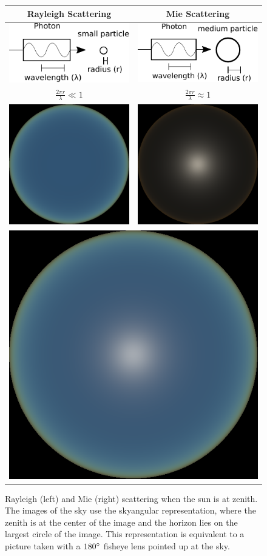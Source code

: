 \begin{figure}
\centering
\newcommand\Tstrut{\rule{0pt}{1\normalbaselineskip}}         %
\newcommand\Bstrut{\rule[-1.5em]{0pt}{0pt}}   %
\begin{tabular}{|c|c|}
\hline
\Tstrut Rayleigh Scattering & Mie Scattering \\ \hline
\rule{0pt}{5\normalbaselineskip}\includegraphics[width=0.25\linewidth]{simulation/small_particle.pdf} &
\includegraphics[width=0.25\linewidth]{simulation/medium_particle.pdf}\\
\rule{0pt}{1.5\normalbaselineskip}\Bstrut $\frac{2\pi r}{\lambda} \ll 1$ & $\frac{2\pi r}{\lambda} \approx 1$\\ \hline
\includegraphics[width=0.25\linewidth]{simulation/skydome_rayleigh.png} &
\includegraphics[width=0.25\linewidth]{simulation/skydome_mie.png} \\ \hline
\multicolumn{2}{|c|}{
\includegraphics[width=0.25\linewidth]{simulation/skydome.png}} \\ \hline
\end{tabular}
\caption[Visualisations of the Rayleigh and Mie scattering]{Rayleigh (left) and Mie (right) scattering when the sun is at zenith. The images of the sky use the skyangular representation, where the zenith is at the center of the image and the horizon lies on the largest circle of the image. This representation is equivalent to a picture taken with a $180^{\circ}$ fisheye lens pointed up at the sky.}
\label{fig:physics_simulations}
\end{figure}

